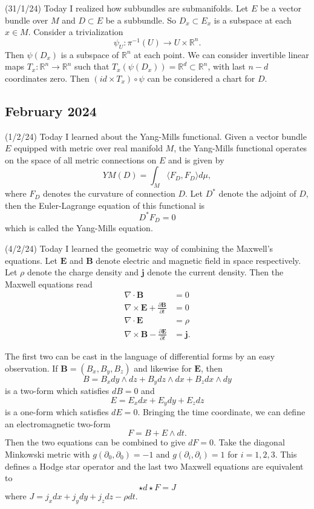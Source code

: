 \documentclass[12pt,a4paper]{article}
\newcommand{\R}{\mathbb{R}}
\begin{document}
(31/1/24) Today I realized how subbundles are submanifolds. Let $ E $ be a vector bundle over $ M $ and $ D \subset E $ be a subbundle. So $ D_{x} \subset E_{x} $ is a subspace at each $ x \in M $. Consider a trivialization 
\[ \psi_{U} : \pi^{-1}(U) \to U \times \R^{n} .\]
Then $ \psi (D_{x}) $ is a subspace of $\R^{n}$ at each point. We can consider invertible linear maps $ T_{x} : \R^{n}  \to \R^{n}$ such that $ T_{x}(\psi(D_{x})) = \R^{d} \subset \R^{n} $, with last $ n-d $ coordinates zero.  Then $ (id \times T_{x}) \circ\psi $ can be considered a chart for $ D $.

\subsection*{February 2024}
\quad(1/2/24) Today I learned about the Yang-Mills functional. Given a vector bundle $ E $ equipped with metric over real manifold $ M $, the Yang-Mills functional operates on the space of all metric connections on $ E $ and is given by 
\[ YM(D) = \int_{M} \langle F_{D},F_{D} \rangle d \mu, \]
where $ F_{D} $ denotes the curvature of connection $ D $. Let $ D^{*} $ denote the adjoint of $ D $, then the Euler-Lagrange equation of this functional is 
\[ D^{*}F_{D} = 0 \]
which is called the Yang-Mills equation.

(4/2/24) Today I learned the geometric way of combining the Maxwell's equations. Let $ \textbf{E}  $ and $ \textbf{B}  $ denote electric and magnetic field in space respectively. Let $ \rho $ denote the charge density and $ \textbf{j} $ denote the current density. Then the Maxwell equations read 
\begin{align*}
   \nabla \cdot \textbf{B}  &= 0 \\
   \nabla \times \textbf{E} + \frac{\partial \textbf{B}}{ \partial t} &= 0 \\
   \nabla \cdot \mathbf{E} &= \rho \\
   \nabla \times \mathbf{B} - \frac{\partial \mathbf{E}}{\partial t} & = \mathbf{j}.
\end{align*}

The first two can be cast in the language of differential forms by an easy observation. If $ \mathbf{B} = (B_{x}, B_{y},B_{z}) $ and likewise for $ \mathbf{E} $, then 
\[ B = B_{x}dy\wedge dz+B_{y}dz \wedge dx+ B_{z} dx \wedge dy\]
is a two-form which satisfies $ dB=0 $ and 
\[ E = E_{x}dx +E_{y}dy + E_{z}dz \] is a one-form which satisfies $ dE = 0 $. Bringing the time coordinate, we can define an electromagnetic two-form 
\[ F = B + E \wedge dt. \]
Then the two equations can be combined to give $ dF = 0 $. Take the diagonal Minkowski metric with $ g(\partial_{0},\partial_{0}) = -1 $ and $ g(\partial_{i},\partial_{i}) = 1 $ for $ i = 1,2,3 $. This defines a Hodge star operator and the last two Maxwell equations are equivalent to 
\[ \star d \star F = J \]
where $ J = j_{x}dx+j_{y}dy+j_{z}dz - \rho dt $.
\end{document}
